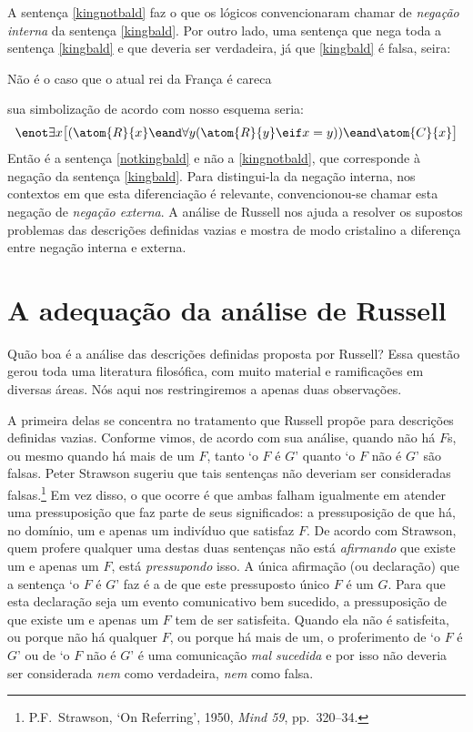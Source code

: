 A sentença \ref{kingnotbald} faz o que os lógicos convencionaram chamar de  \emph{negação interna} da sentença \ref{kingbald}.
Por outro lado, uma sentença que nega toda a sentença \ref{kingbald} e que deveria ser verdadeira, já que \ref{kingbald} é falsa, seira:
	\begin{earg}
		\item[\ex{notkingbald}] Não é o caso que o atual rei da França é careca
	\end{earg}
sua simbolização de acordo com nosso esquema seria:
$$\enot\exists x \bigl[(\atom{R}{x} \eand \forall y (\atom{R}{y} \eif x = y)) \eand \atom{C}{x}\bigr]$$
Então é a sentença \ref{notkingbald} e não a \ref{kingnotbald}, que corresponde à negação da sentença \ref{kingbald}.
Para distingui-la da negação interna, nos contextos em que esta diferenciação é relevante, convencionou-se chamar esta negação de \emph{negação externa}.
A análise de Russell nos ajuda a resolver os supostos problemas das descrições definidas vazias e mostra de modo cristalino a diferença entre negação interna e externa.


\section{A adequação da análise de Russell}
Quão boa é a análise das descrições definidas proposta por Russell?
Essa questão gerou toda uma literatura filosófica, com muito material e ramificações em diversas áreas.
Nós aqui nos restringiremos a apenas duas observações.

A primeira delas se concentra no tratamento que Russell propõe para descrições definidas vazias.
Conforme vimos, de acordo com sua análise, quando não há $F$s, ou mesmo quando há mais de um $F$, tanto `o $F$ é $G$' quanto `o $F$ não é $G$' são falsas.
Peter Strawson sugeriu que tais sentenças não deveriam ser consideradas falsas.\footnote{
	P.F.\ Strawson, `On Referring', 1950, \emph{Mind 59}, pp.\ 320--34.}
Em vez disso, o que ocorre é que ambas falham igualmente em atender uma pressuposição que faz parte de seus significados: a pressuposição de que há, no domínio, um e apenas um indivíduo que satisfaz $F$.
De acordo com Strawson, quem profere qualquer uma destas duas sentenças não está \emph{afirmando} que existe um e apenas um $F$, está \emph{pressupondo} isso. A única afirmação (ou declaração) que a sentença `o $F$ é $G$' faz é a de que este pressuposto único $F$ é um $G$.
Para que esta declaração seja um evento comunicativo bem sucedido, a pressuposição de que existe um e apenas um $F$ tem de ser satisfeita.
Quando ela não é satisfeita, ou porque não há qualquer $F$, ou porque há mais de um, o proferimento de `o $F$ é $G$' ou de `o $F$ não é $G$' é uma comunicação \emph{mal sucedida} e por isso não deveria ser considerada \emph{nem} como verdadeira, \emph{nem} como falsa.

